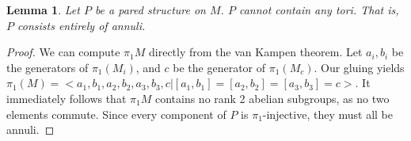 \documentclass[12pt]{amsart}
\newtheorem{lemma}[theorem]{Lemma}
\theoremstyle{definition}
\begin{document}
\begin{lemma}

Let $P$ be a pared structure on $M$. $P$ cannot contain any tori. That is,
$P$ consists entirely of annuli.

\end{lemma}
\begin{proof}

We can compute $\pi_1M$ directly from the van Kampen theorem. Let $a_i,b_i$ be
the generators of $\pi_1(M_i)$, and $c$ be the generator of $\pi_1(M_c)$. Our gluing yields
$\pi_1(M) = <a_1,b_1,a_2,b_2,a_3,b_3,c| [a_1,b_1]=[a_2,b_2]=[a_3,b_3]=c>$. It immediately
follows that $\pi_1M$ contains no rank 2 abelian subgroups, as no two elements
commute. Since every component of $P$ is $\pi_1$-injective, they must all be annuli.

\end{proof}
\end{document}
